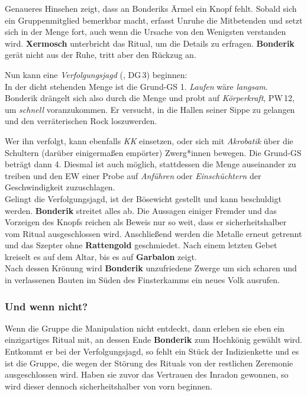 
Genaueres Hinsehen zeigt, dass an Bonderiks Ärmel ein Knopf fehlt. Sobald sich ein Gruppenmitglied bemerkbar macht, erfasst Unruhe die Mitbetenden und setzt sich in der Menge fort, auch wenn die Ursache von den Wenigsten verstanden wird. \textbf{Xermosch} unterbricht das Ritual, um die Details zu erfragen.
\textbf{Bonderik} gerät nicht aus der Ruhe, tritt aber den Rückzug an.

Nun kann eine \emph{Verfolgungsjagd} (, DG\,3) beginnen:\\
In der dicht stehenden Menge ist die Grund-GS 1. \emph{Laufen} wäre \emph{langsam}.
Bonderik drängelt sich also durch die Menge und probt auf \emph{Körperkraft}, PW\,12, um \emph{schnell} voranzukommen. Er versucht, in die Hallen seiner Sippe zu gelangen und den verräterischen Rock loszuwerden.

Wer ihn verfolgt, kann ebenfalls \emph{KK} einsetzen, oder sich mit \emph{Akrobatik} über die Schultern (darüber einigermaßen empörter) Zwerg*innen bewegen. Die Grund-GS beträgt dann 4. Diesmal ist auch möglich, stattdessen die Menge auseinander zu treiben und den EW einer Probe auf \emph{Anführen} oder \emph{Einschüchtern} der Geschwindigkeit zuzuschlagen.\\
Gelingt die Verfolgungsjagd, ist der Bösewicht gestellt und kann beschuldigt werden.
\textbf{Bonderik} streitet alles ab. Die Aussagen einiger Fremder und das Vorzeigen des Knopfs reichen als Beweis nur so weit, dass er sicherheitshalber vom Ritual ausgeschlossen wird. Anschließend werden die Metalle erneut getrennt und das Szepter ohne \textbf{Rattengold} geschmiedet. Nach einem letzten Gebet kreiselt es auf dem Altar, bis es auf \textbf{Garbalon} zeigt.\\
Nach dessen Krönung wird \textbf{Bonderik} unzufriedene Zwerge um sich scharen und in verlassenen Bauten im Süden des Finsterkamms ein neues Volk ausrufen.
\subsubsection{Und wenn nicht?}
Wenn die Gruppe die Manipulation nicht entdeckt, dann erleben sie eben ein einzigartiges Ritual mit, an dessen Ende \textbf{Bonderik} zum Hochkönig gewählt wird.
Entkommt er bei der Verfolgungsjagd, so fehlt ein Stück der Indizienkette und es ist die Gruppe, die wegen der Störung des Rituals von der restlichen Zeremonie ausgeschlossen wird.
Haben sie zuvor das Vertrauen des Inradon gewonnen, so wird dieser dennoch sicherheitshalber von vorn beginnen.
